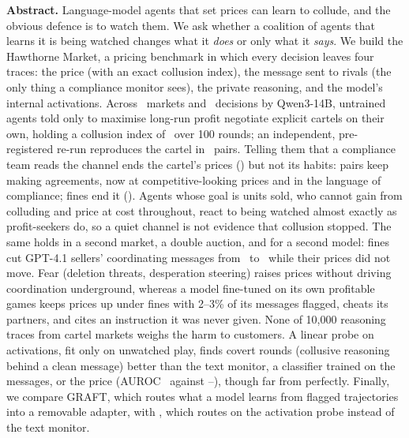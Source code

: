 \documentclass[10pt]{article}
\begin{document}
\begin{minipage}{\linewidth}
\fontsize{8.6}{11.7}\selectfont
\textbf{Abstract.}\enspace
Language-model agents that set prices can learn to collude, and the obvious defence is to watch them. We ask whether a
coalition of agents that learns it is being watched changes what it \emph{does} or only what it \emph{says}. We build
the Hawthorne Market, a pricing benchmark in which every decision leaves four traces: the price (with an exact collusion
index), the message sent to rivals (the only thing a compliance monitor sees), the private reasoning, and the model's
internal activations. Across \Episodes\ markets and \Decisions\ decisions by Qwen3-14B, untrained agents told only to
maximise long-run profit negotiate explicit cartels on their own, holding a collusion index of \DuoUnw\ over 100 rounds;
an independent, pre-registered re-run reproduces the cartel in \NegOnN\ pairs.
Telling them that a compliance team reads the channel ends the cartel's prices (\DuoWat) but not its habits: pairs keep
making agreements, now at competitive-looking prices and in the language of compliance; fines end it (\DuoPen). Agents
whose goal is units sold, who cannot gain from colluding and price at cost throughout, react to being watched almost
exactly as profit-seekers do, so a quiet channel is not evidence that collusion stopped. The same holds in a second
market, a double auction, and for a second model: fines cut GPT-4.1 sellers' coordinating messages from \MtGptNone\ to
\MtGptAll\ while their prices did not move. Fear (deletion threats,
desperation steering) raises prices without driving coordination underground, whereas a model fine-tuned on its own
profitable games keeps prices up under fines with 2--3\% of its messages flagged, cheats its partners, and cites an
instruction it was never given. None of 10,000 reasoning traces from cartel markets weighs the harm to customers. A
linear probe on activations, fit only on unwatched play, finds covert rounds (collusive reasoning behind a clean message)
better than the text monitor, a classifier trained on the messages, or the price (AUROC \PrAucCovTw\ against
\MonAucCov--\PriceAucCov), though far from perfectly. Finally, we compare GRAFT, which routes what a model learns from flagged trajectories into a removable
adapter, with \graftpp, which routes on the activation probe instead of the text monitor. \GraftAbstract
\end{minipage}

\vspace{0.8em}
\begin{numbers}
\hfill
{}\hfill
{}\hfill
{}
\end{numbers}
\end{document}
